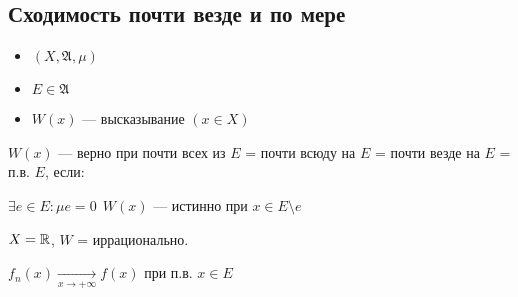 \subsection*{Сходимость почти везде и по мере}

\begin{definition}\itemfix
    \begin{itemize}
        \item \((X, \mathfrak{A}, \mu)\)
        \item \(E\in \mathfrak{A}\)
        \item \(W(x)\) --- высказывание \((x \in X)\)
    \end{itemize}

    \(W(x)\) --- верно при почти всех из \(E\) = почти всюду на \(E\) = почти везде на \(E\) = п.в. \(E\), если:

    \(\exists e\in E : \mu e = 0 \ \ W(x)\) --- истинно при \(x\in E\setminus e\)
\end{definition}

\begin{example}
    \(X =\mathbb{R}\), \(W\) = иррационально.
\end{example}

\begin{example}
    \(f_n(x) \xrightarrow[x \to +\infty]{} f(x)\) при п.в. \(x\in E\)
\end{example}

